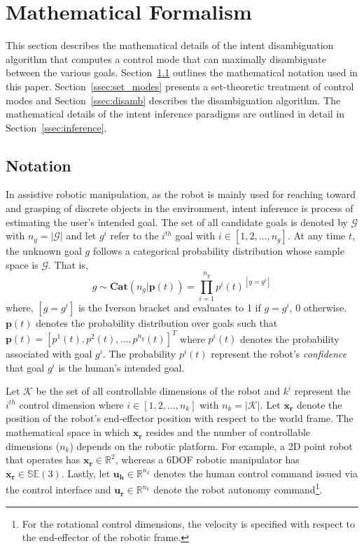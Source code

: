 \documentclass[conference]{IEEEtran}
\begin{document}
\section{Mathematical Formalism}\label{sec:math}
This section describes the mathematical details of the intent disambiguation algorithm that computes a control mode that can maximally disambiguate between the various goals. Section~\ref{ssec:notation} outlines the mathematical notation used in this paper. Section~\ref{ssec:set_modes} presents a set-theoretic treatment of control modes and Section~\ref{ssec:disamb} describes the disambiguation algorithm. The mathematical details of the intent inference paradigms are outlined in detail in Section~\ref{ssec:inference}.
\subsection{Notation}\label{ssec:notation}
 In assistive robotic manipulation, as the robot is mainly used for reaching toward and grasping of discrete objects in the environment, intent inference is process of estimating the user's intended goal. The set of all candidate goals is denoted by $\mathcal{G}$ with $n_g = \vert\mathcal{G}\vert$ and let $g^i$ refer to the $i^{th}$ goal with $i \in [1,2,\dots, n_g]$. At any time $t$, the unknown goal $g$ follows a categorical probability distribution whose sample space is $\mathcal{G}$. 
 That is, 
 \begin{equation*}
 g \sim \textbf{Cat}(n_g | \boldsymbol{p}(t)) = \prod_{i=1}^{n_g}p^{i}(t)^{[g = g^i]}
 \end{equation*}
where, $[g = g^i]$ is the Iverson bracket and evaluates to 1 if $g = g^i$, 0 otherwise. $\boldsymbol{p}(t)$ denotes the probability distribution over goals such that $\boldsymbol{p}(t) = [p^1(t), p^2(t),\dots, p^{n_g}(t)]^{T}$ where $p^i(t)$ denotes the probability associated with goal $g^i$.  The probability $p^i(t)$ represent the robot's \textit{confidence} that goal $g^i$ is the human's intended goal. 

Let $\mathcal{K}$ be the set of all controllable dimensions of the robot and $k^i$ represent the $i^{th}$ control dimension where $i \in [1,2,\dots,n_k]$ with $n_k = \vert\mathcal{K}\vert$. Let $\boldsymbol{x_r}$ denote the position of the robot's end-effector position with respect to the world frame. The mathematical space in which $\boldsymbol{x_r}$ resides and the number of controllable dimensions ($n_k$) depends on the robotic platform. For example, a 2D point robot that operates has $\boldsymbol{x_r} \in \mathbb{R}^2$, whereas a 6DOF robotic manipulator has $\boldsymbol{x_r} \in \mathbb{SE}(3)$. Lastly, let $\boldsymbol{u_h} \in \mathbb{R}^{n_k}$ denotes the human control command issued via the control interface and $\boldsymbol{u_r} \in \mathbb{R}^{n_k}$ denote the robot autonomy command\footnote{For the rotational control dimensions, the velocity is specified with respect to the end-effector of the robotic frame.}. 
\end{document}
